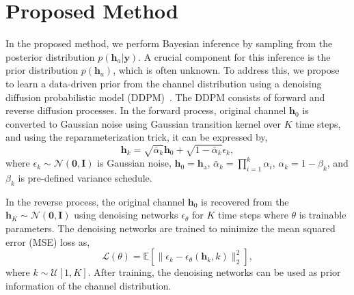 \documentclass[lettersize,journal]{IEEEtran}
\begin{document}
\section{Proposed Method}

In the proposed method, we perform Bayesian inference by sampling from the posterior distribution $p(\mathbf{h}_{a}|\mathbf{y})$. A crucial component for this inference is the prior distribution $p(\mathbf{h}_{a})$, which is often unknown. To address this, we propose to learn a data-driven prior from the channel distribution using a denoising diffusion probabilistic model (DDPM)~\cite{hoDenoisingDiffusionProbabilistic2020}. The DDPM consists of forward and reverse diffusion processes. In the forward process, original channel $\mathbf{h}_{0}$ is converted to Gaussian noise using Gaussian transition kernel over $K$ time steps, and using the reparameterization trick, it can be expressed by,
\begin{equation}
\mathbf{h}_{k} = \sqrt{ \bar{\alpha}_{k} }\mathbf{h}_{0} + \sqrt{ 1-\bar{\alpha}_{k} }\epsilon_{k},
\end{equation}
where $\epsilon_{k}\sim\mathcal{N}(\mathbf{0},\mathbf{I})$ is Gaussian noise, $\mathbf{h}_{0} = \mathbf{h}_{\text{a}}$, $\bar{\alpha}_{k}=\prod_{i=1}^{k}\alpha_{i}$, $\alpha_{k}=1-\beta_{k}$, and $\beta_{k}$ is pre-defined variance schedule.

In the reverse process, the original channel $\mathbf{h}_{0}$ is recovered from the $\mathbf{h}_{K}\sim\mathcal{N}(\mathbf{0},\mathbf{I})$ using denoising networks $\epsilon_{\theta}$ for $K$ time steps where $\theta$ is trainable parameters. The denoising networks are trained to minimize the mean squared error (MSE) loss as,
\begin{equation}
\mathcal{L}(\theta) = \mathbb{E}[\|\epsilon_{k} - \epsilon_{\theta}(\mathbf{h}_{k},k)\|_{2}^{2}],
\end{equation}
where $k\sim\mathcal{U}[1,K]$. After training, the denoising networks can be used as prior information of the channel distribution.
\end{document}
